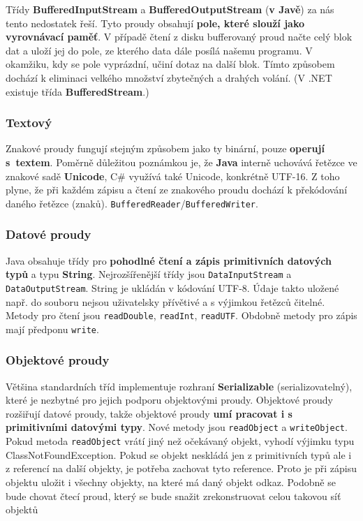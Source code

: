 Třídy \textbf{BufferedInputStream} a \textbf{BufferedOutputStream} (\textbf{v Javě}) za nás tento nedostatek řeší. Tyto proudy obsahují \textbf{pole, které slouží jako vyrovnávací paměť}. V případě čtení z disku bufferovaný proud načte celý blok dat a uloží jej do pole, ze kterého data dále posílá našemu programu. V okamžiku, kdy se pole vyprázdní, učiní dotaz na další blok. Tímto způsobem dochází k eliminaci velkého množství zbytečných a drahých volání. (V .NET existuje třída \textbf{BufferedStream}.)

\subsubsection{Textový}
Znakové proudy fungují stejným způsobem jako ty binární, pouze \textbf{operují s textem}. Poměrně důležitou poznámkou je, že \textbf{Java} interně uchovává řetězce ve znakové sadě \textbf{Unicode}, C\# využívá také Unicode, konkrétně UTF-16. Z toho plyne, že při každém zápisu a čtení ze znakového proudu dochází k překódování daného řetězce (znaků). \texttt{BufferedReader}/\texttt{BufferedWriter}.

\subsubsection{Datové proudy}
Java obsahuje třídy pro \textbf{pohodlné čtení a zápis primitivních datových typů} a typu \textbf{String}. Nejrozšířenější třídy jsou \texttt{DataInputStream} a \texttt{DataOutputStream}. String je ukládán v kódování UTF-8. Údaje takto uložené např. do souboru nejsou uživatelsky přívětivé a s výjimkou řetězců čitelné. Metody pro čtení jsou \texttt{readDouble}, \texttt{readInt}, \texttt{readUTF}. Obdobně metody pro zápis mají předponu \texttt{write}.

\subsubsection{Objektové proudy}
Většina standardních tříd implementuje rozhraní \textbf{Serializable} (serializovatelný), které je nezbytné pro jejich podporu objektovými proudy. Objektové proudy rozšiřují datové proudy, takže objektové proudy \textbf{umí pracovat i s primitivními datovými typy}. Nové metody jsou \texttt{readObject} a \texttt{writeObject}. Pokud metoda \texttt{readObject} vrátí jiný než očekávaný objekt, vyhodí výjimku typu ClassNotFoundException. Pokud se objekt neskládá jen z primitivních typů ale i z referencí na další objekty, je potřeba zachovat tyto reference. Proto je při zápisu objektu uložit i všechny objekty, na které má daný objekt odkaz. Podobně se bude chovat čtecí proud, který se bude snažit zrekonstruovat celou takovou síť objektů

